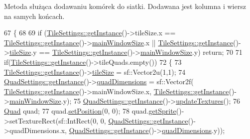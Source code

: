 Metoda służąca dodawaniu komórek do siatki. Dodawana jest kolumna i wiersz na samych końcach. 
\begin{DoxyCode}
67 \{
68 
69     \textcolor{keywordflow}{if} (\mbox{\hyperlink{class_tile_settings_a003ae6e78b97855c8592b2b4c0818914}{TileSettings::getInstance}}()->tileSize.x == 
      \mbox{\hyperlink{class_tile_settings_a003ae6e78b97855c8592b2b4c0818914}{TileSettings::getInstance}}()->\mbox{\hyperlink{class_tile_settings_a2b24689813e0082b59df113b754778c2}{mainWindowSize}}.x || 
      \mbox{\hyperlink{class_tile_settings_a003ae6e78b97855c8592b2b4c0818914}{TileSettings::getInstance}}()->\mbox{\hyperlink{class_tile_settings_ae4be54be3619d21d536ce13b7354f165}{tileSize}}.y == 
      \mbox{\hyperlink{class_tile_settings_a003ae6e78b97855c8592b2b4c0818914}{TileSettings::getInstance}}()->\mbox{\hyperlink{class_tile_settings_a2b24689813e0082b59df113b754778c2}{mainWindowSize}}.y) \textcolor{keywordflow}{return};
70 
71     \textcolor{keywordflow}{if}(\mbox{\hyperlink{class_tile_settings_a003ae6e78b97855c8592b2b4c0818914}{TileSettings::getInstance}}()->tileQuads.empty())
72     \{
73         \mbox{\hyperlink{class_tile_settings_a003ae6e78b97855c8592b2b4c0818914}{TileSettings::getInstance}}()->\mbox{\hyperlink{class_tile_settings_ae4be54be3619d21d536ce13b7354f165}{tileSize}} = sf::Vector2u(1,1);
74         \mbox{\hyperlink{class_quad_settings_a20d7cfd0c56c11adcdf75c5e3011de67}{QuadSettings::getInstance}}()->\mbox{\hyperlink{class_quad_settings_abb4a967873d7a93098ef168b894280d6}{quadDimensions}} = sf::Vector2f(
      \mbox{\hyperlink{class_tile_settings_a003ae6e78b97855c8592b2b4c0818914}{TileSettings::getInstance}}()->mainWindowSize.x, 
      \mbox{\hyperlink{class_tile_settings_a003ae6e78b97855c8592b2b4c0818914}{TileSettings::getInstance}}()->\mbox{\hyperlink{class_tile_settings_a2b24689813e0082b59df113b754778c2}{mainWindowSize}}.y);
75         \mbox{\hyperlink{class_quad_settings_a20d7cfd0c56c11adcdf75c5e3011de67}{QuadSettings::getInstance}}()->\mbox{\hyperlink{class_quad_settings_a05e0e32535731778852480ab4c993cce}{updateTextures}}();
76         \mbox{\hyperlink{class_quad}{Quad}} quad;
77         quad.\mbox{\hyperlink{class_quad_a1f3970e8f264eabe131e20af7017f940}{setPosition}}(0, 0);
78         quad.\mbox{\hyperlink{class_quad_a35f20e65dd33bb5864f73575b04896e7}{getSprite}}()->setTextureRect(sf::IntRect(0, 0, 
      \mbox{\hyperlink{class_quad_settings_a20d7cfd0c56c11adcdf75c5e3011de67}{QuadSettings::getInstance}}()->quadDimensions.x, 
      \mbox{\hyperlink{class_quad_settings_a20d7cfd0c56c11adcdf75c5e3011de67}{QuadSettings::getInstance}}()->\mbox{\hyperlink{class_quad_settings_abb4a967873d7a93098ef168b894280d6}{quadDimensions}}.y));

\end{DoxyCode}
